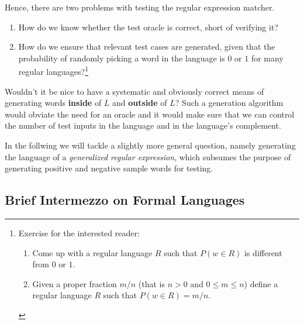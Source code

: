 Hence, there are two problems with testing the regular expression
matcher.
\begin{enumerate}
\item How do we know whether the test oracle is correct, short of
  verifying it?
\item How do we ensure that relevant test cases are generated, given
  that the probability of randomly picking a word in the language is
  $0$ or $1$ for many regular languages?\footnote{Exercise for the
    interested reader:
    \begin{enumerate}
    \item Come up with a regular language $R$ such that $P(w\in R)$ is
      different from $0$ or $1$.
    \item Given a proper fraction $m/n$ (that is $n>0$ and $0\le m\le
      n$) define a regular language $R$ such that $P (w\in R) = m/n$.
    \end{enumerate}
  }
\end{enumerate}


Wouldn't it be nice to have a systematic and obviously correct means
of generating words \textbf{inside} of $L$ and \textbf{outside} of
$L$? Such a generation algorithm would obviate the need for an oracle
and it would make sure that we can control the number of test inputs
in the language and in the language's complement.

In the follwing we will tackle a slightly more general question, namely generating
the language of a \emph{generalized regular expression}, 
which subsumes the purpose of generating positive and negative sample
words for testing.

\subsection{Brief Intermezzo on Formal Languages}
\label{sec:research-question}

